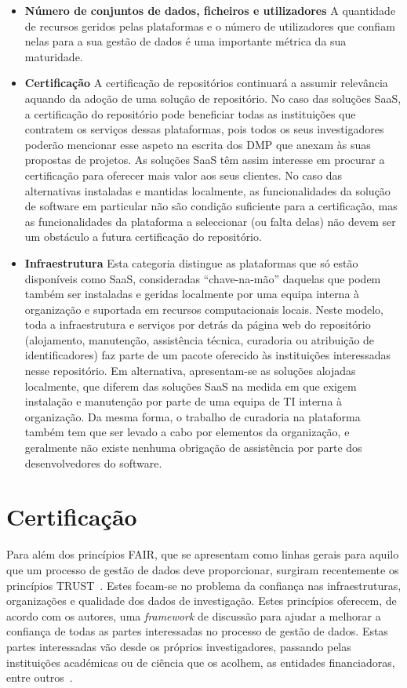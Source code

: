 \documentclass[sigconf,nonacm]{acmart}
\begin{document}
\begin{itemize}
	\item \textbf{Número de conjuntos de dados, ficheiros e utilizadores}
	A quantidade de recursos geridos pelas plataformas e o número de utilizadores que confiam nelas para a sua gestão de dados é uma importante métrica da sua maturidade. 
	\item \textbf{Certificação}
	A certificação de repositórios continuará a assumir relevância aquando da adoção de uma solução de repositório. No caso das soluções \gls{SaaS}, a certificação do repositório pode beneficiar todas as instituições que contratem os serviços dessas plataformas, pois todos os seus investigadores poderão mencionar esse aspeto na escrita dos DMP que anexam às suas propostas de projetos. As soluções \gls{SaaS} têm assim interesse em procurar a certificação para oferecer mais valor aos seus clientes. No caso das alternativas instaladas e mantidas localmente, as funcionalidades da solução de software em particular não são condição suficiente para a certificação, mas as funcionalidades da plataforma a seleccionar (ou falta delas) não devem ser um obstáculo a futura certificação do repositório.
	\item \textbf{Infraestrutura}
	Esta categoria distingue as plataformas que só estão disponíveis como \gls{SaaS}, consideradas ``chave-na-mão'' daquelas que podem também ser instaladas e geridas localmente por uma equipa interna à organização e suportada em recursos computacionais locais. Neste modelo, toda a infraestrutura e serviços por detrás da página web do repositório (alojamento, manutenção, assistência técnica, curadoria ou atribuição de identificadores) faz parte de um pacote oferecido às instituições interessadas nesse repositório. Em alternativa, apresentam-se as soluções alojadas localmente, que diferem das soluções \gls{SaaS} na medida em que exigem instalação e manutenção por parte de uma equipa de \gls{TI} interna à organização. Da mesma forma, o trabalho de curadoria na plataforma também tem que ser levado a cabo por elementos da organização, e geralmente não existe nenhuma obrigação de assistência por parte dos desenvolvedores do software.
\end{itemize}



\section{Certificação} %
\label{sec:certificacao}

Para além dos princípios \gls{FAIR}, que se apresentam como linhas gerais para aquilo que um processo de gestão de dados deve proporcionar, surgiram recentemente os princípios \gls{TRUST}~\cite{TRUSTprinciples}. Estes focam-se no problema da confiança nas infraestruturas, organizações e qualidade dos dados de investigação. Estes princípios oferecem, de acordo com os autores, uma \emph{framework} de discussão para ajudar a melhorar a confiança de todas as partes interessadas no processo de gestão de dados. Estas partes interessadas vão desde os próprios investigadores, passando pelas instituições académicas ou de ciência que os acolhem, as entidades financiadoras, entre outros~\cite{DCC_stakeholders}.
\end{document}
